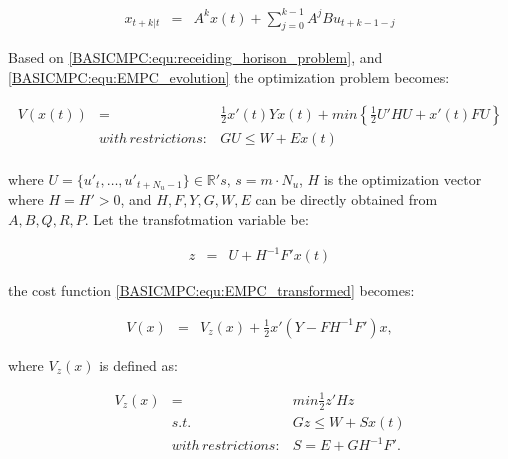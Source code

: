 \begin{equation}
        \begin{array}{rcl}
				x_{t+k|t}&=&A^kx(t)+\sum^{k-1}_{j=0}A^jBu_{t+k-1-j}
        \end{array}
        \label{BASICMPC:equ:EMPC_evolution}
    \end{equation}

Based on \ref{BASICMPC:equ:receiding_horison_problem}, and \ref{BASICMPC:equ:EMPC_evolution} the optimization problem becomes:

\begin{equation}
        \begin{array}{rcl}
				V(x(t))&=&\frac{1}{2}x'(t)Yx(t)+min\left\{\frac{1}{2}U'HU+x'(t)FU\right\}\\
				&with\,restrictions:&GU\leq W+Ex(t)\\
        \end{array}
        \label{BASICMPC:equ:EMPC_transformed}
    \end{equation}
		
		where $U=\{u'_t,\dots,u'_{t+N_u-1}\}\in\mathbb{R}'s,\,s=m\cdot N_u$, $H$ is the optimization vector where $H=H'>0$, and $H,F,Y,G,W,E$ can be directly obtained from $A,B,Q,R,P$. Let the transfotmation variable be:
		
		\begin{equation}
        \begin{array}{rcl}
				z&=&U+H^{-1}F'x(t)
        \end{array}
        \label{BASICMPC:equ:EMPC_trans_var}
    \end{equation}
		
		the cost function \ref{BASICMPC:equ:EMPC_transformed} becomes:
		
		\begin{equation}
        \begin{array}{rcl}
				V(x)&=&V_z(x)+\frac{1}{2}x'\left(Y-FH^{-1}F'\right)x,
        \end{array}
        \label{BASICMPC:equ:EMPC_trans_var}
    \end{equation}
		
		where $V_z(x)$ is defined as:
		
		\begin{equation}
        \begin{array}{rcl}
				V_z(x)&=&min\frac{1}{2}z'Hz\\
				&s.t.&Gz\leq W+Sx(t)\\
				&with\,restrictions:&S=E+GH^{-1}F'.\\
        \end{array}
        \label{BASICMPC:equ:EMPC_transformed}
    \end{equation}
		
